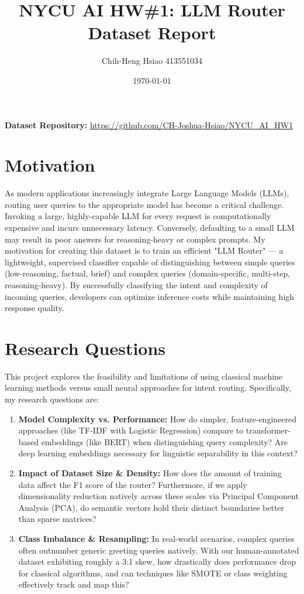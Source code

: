 \documentclass[12pt, a4paper]{article}
\title{NYCU AI HW\#1: LLM Router Dataset Report}
\author{Chih-Heng Hsiao 413551034}
\date{\today}
\begin{document}
\maketitle

\textbf{Dataset Repository:} \href{https://github.com/CH-Joshua-Hsiao/NYCU_AI_HW1}{https://github.com/CH-Joshua-Hsiao/NYCU\_AI\_HW1}

\section{Motivation}
As modern applications increasingly integrate Large Language Models (LLMs), routing user queries to the appropriate model has become a critical challenge. Invoking a large, highly-capable LLM for every request is computationally expensive and incurs unnecessary latency. Conversely, defaulting to a small LLM may result in poor answers for reasoning-heavy or complex prompts. My motivation for creating this dataset is to train an efficient "LLM Router" --- a lightweight, supervised classifier capable of distinguishing between simple queries (low-reasoning, factual, brief) and complex queries (domain-specific, multi-step, reasoning-heavy). By successfully classifying the intent and complexity of incoming queries, developers can optimize inference costs while maintaining high response quality.

\section{Research Questions}
This project explores the feasibility and limitations of using classical machine learning methods versus small neural approaches for intent routing. Specifically, my research questions are:
\begin{enumerate}
    \item \textbf{Model Complexity vs. Performance:} How do simpler, feature-engineered approaches (like TF-IDF with Logistic Regression) compare to transformer-based embeddings (like BERT) when distinguishing query complexity? Are deep learning embeddings necessary for linguistic separability in this context?
    \item \textbf{Impact of Dataset Size \& Density:} How does the amount of training data affect the F1 score of the router? Furthermore, if we apply dimensionality reduction natively across these scales via Principal Component Analysis (PCA), do semantic vectors hold their distinct boundaries better than sparse matrices?
    \item \textbf{Class Imbalance \& Resampling:} In real-world scenarios, complex queries often outnumber generic greeting queries natively. With our human-annotated dataset exhibiting roughly a 3:1 skew, how drastically does performance drop for classical algorithms, and can techniques like SMOTE or class weighting effectively track and map this?
\end{enumerate}
\end{document}
